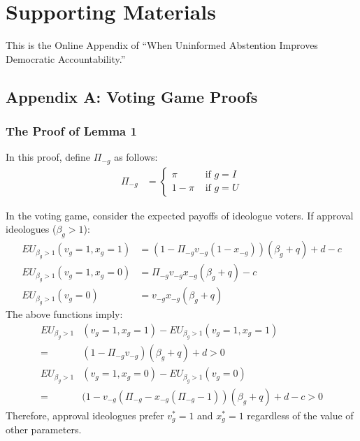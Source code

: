 
\clearpage
\appendix
\pagestyle{plain}
\setcounter{page}{1}

\section{Supporting Materials } %

\par This is the Online Appendix of ``When Uninformed Abstention Improves Democratic Accountability.''

\subsection{Appendix A: Voting Game Proofs}

\subsubsection{The Proof of Lemma 1}

\par In this proof, define $\Pi_{-g}$ as follows:
\begin{align*}
	\Pi_{-g} &= \begin{cases}
		\pi &\text{ if } g = I \\
		1-\pi &\text{ if } g = U
		\end{cases}
\end{align*} 

\par In the voting game, consider the expected payoffs of ideologue voters. 
If approval ideologues ($\beta_g > 1$):
\begin{align*}
EU_{\beta_g > 1 }(v_g=1, x_g=1) &= (1-\Pi_{-g} v_{-g} (1- x_{-g}))(\beta_g + q) + d - c \\
EU_{\beta_g > 1 }(v_g=1, x_g=0) &= \Pi_{-g} v_{-g} x_{-g} (\beta_g + q) - c \\
EU_{\beta_g > 1 }(v_g=0) &= v_{-g} x_{-g} (\beta_g + q)
\end{align*} 
\noindent The above functions imply: 
\begin{align*}
EU_{\beta_g > 1}&(v_g=1, x_g=1) - EU_{\beta_g > 1 }(v_g=1, x_g=1) \\
=& (1- \Pi_{-g} v_{-g})(\beta_g + q) + d > 0 \\
EU_{\beta_g > 1}&(v_g=1, x_g=0) - EU_{\beta_g > 1 }(v_g=0)  \\
=& (1-v_{-g} (\Pi_{-g} - x_{-g}(\Pi_{-g} - 1))(\beta_g + q) + d -c > 0 
\end{align*}
\noindent Therefore, approval ideologues prefer $v^*_g=1$ and $x^*_g=1$ regardless of the value of other parameters.

